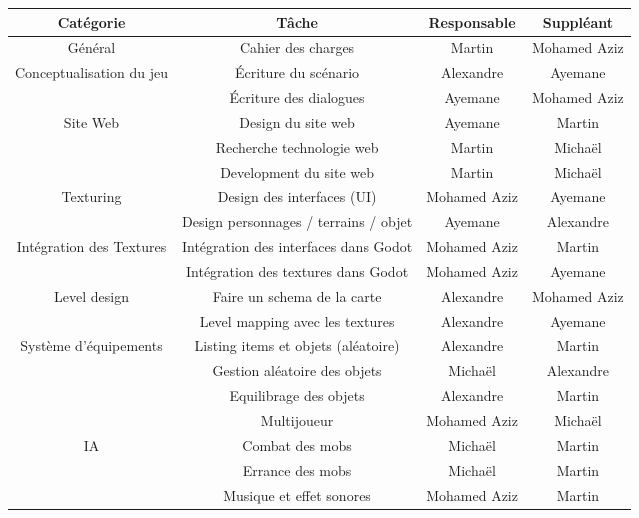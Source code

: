 \begin{figure}[H]
    \centering
    \begin{tabular}{|c|c|c|c|}
        \hline
        \bfseries{Cat\'egorie} & \bfseries{T\^ache} & \bfseries{Responsable} & \bfseries{Suppl\'eant} \\
        \hline\hline
        G\'en\'eral & Cahier des charges & Martin & Mohamed Aziz \\
        \hline\hline
        \multirow{2}{*}{Conceptualisation du jeu} & \'Ecriture du sc\'enario & Alexandre & Ayemane \\
        \cline{2-4}
        & \'Ecriture des dialogues & Ayemane  & Mohamed Aziz \\
        \hline\hline
        \multirow{3}{*}{Site Web} & Design du site web & Ayemane & Martin \\
        \cline{2-4}
        & Recherche technologie web & Martin & Michaël \\
        \cline{2-4}
        & Development du site web & Martin & Michaël \\
        \hline\hline
        \multirow{2}{*}{Texturing} & Design des interfaces (UI) & Mohamed Aziz & Ayemane \\
        \cline{2-4}
        & Design personnages / terrains / objet & Ayemane & Alexandre \\
        \hline\hline
        \multirow{2}{*}{Intégration des Textures} & Int\'egration des interfaces dans Godot & Mohamed Aziz & Martin \\
        \cline{2-4}
        & Int\'egration des textures dans Godot & Mohamed Aziz & Ayemane \\
        \hline\hline
        \multirow{2}{*}{Level design} & Faire un schema de la carte & Alexandre & Mohamed Aziz \\
        \cline{2-4}
        &Level mapping avec les textures & Alexandre & Ayemane \\
        \hline\hline
        \multirow{3}{*}{Système d'équipements} & Listing items et objets (al\'eatoire) & Alexandre & Martin \\
        \cline{2-4}
        & Gestion aléatoire des objets & Michaël & Alexandre \\
        \cline{2-4}
        & Equilibrage des objets & Alexandre & Martin \\
        \hline\hline
        & Multijoueur & Mohamed Aziz & Michaël \\
        \hline\hline
        \multirow{2}{*}{IA} & Combat des mobs & Michaël & Martin \\
        \cline{2-4}
        & Errance des mobs & Michaël & Martin \\
        \hline\hline
        & Musique et effet sonores & Mohamed Aziz & Martin \\
        \hline



\end{tabular}
\end{figure}
